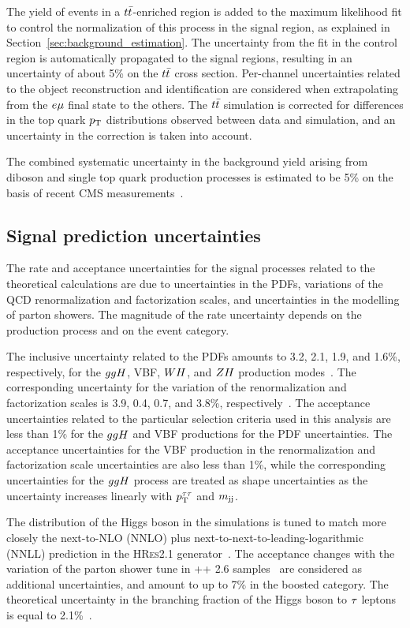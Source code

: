 The yield of events in a $t\bar{t}$-enriched region is added to the maximum likelihood fit to control the normalization of this process
in the signal region, as explained in Section~\ref{sec:background_estimation}. The uncertainty from the fit in the control region is automatically propagated to the signal regions, resulting in an uncertainty of about 5\% on the $t\bar{t}$ cross section. Per-channel uncertainties related to the object reconstruction and identification are considered when extrapolating from the $e\mu$ final state to the others. The $t\bar{t}$ simulation is corrected for differences in the top quark $p_\mathrm{T}$ distributions observed between data and simulation, and an uncertainty in the correction is taken into account.

The combined systematic uncertainty in the background yield arising from diboson and single top quark production processes is estimated to be 5\%
on the basis of recent CMS measurements~\cite{Khachatryan:2016tgp,Sirunyan:2016cdg}.


\subsection{Signal prediction uncertainties}

The rate and acceptance uncertainties for the signal processes related to the theoretical calculations are due to uncertainties in the PDFs, variations of the QCD renormalization and factorization scales,
and uncertainties in the modelling of parton showers.
The magnitude of the rate uncertainty depends on the production process and on the event category.

The inclusive uncertainty related to the PDFs amounts to 3.2, 2.1, 1.9, and 1.6\%, respectively, for the $ ggH $, VBF, $WH$, and $ZH$ production modes~\cite{deFlorian:2016spz}. The
corresponding uncertainty for the variation of the renormalization and factorization scales is 3.9, 0.4, 0.7, and 3.8\%, respectively~\cite{deFlorian:2016spz}.
The acceptance uncertainties related to the particular selection criteria used in this analysis are less than 1\% for the $ ggH $ and VBF productions for the PDF
uncertainties. The acceptance uncertainties for the VBF production in the renormalization and factorization scale uncertainties are also less than 1\%, while the corresponding uncertainties for the $ ggH $ process are treated as shape uncertainties as the uncertainty increases
linearly with $p_\mathrm{T}^{\tau\tau}$ and $m_\mathrm{jj}$.

The \pt distribution of the Higgs boson in the {} simulations is tuned to match more closely
the next-to-NLO (NNLO) plus
next-to-next-to-leading-logarithmic (NNLL) prediction in the
\textsc{HRes2.1} generator~\cite{deFlorian:2012mx,Grazzini:2013mca}.
The acceptance changes with the variation of the parton shower tune in \HERWIG++ 2.6 samples~\cite{Bellm:2013hwb} are considered as additional uncertainties, and amount to up to 7\% in the boosted category. The theoretical uncertainty in the branching fraction of the Higgs boson to $\tau$ leptons is equal to 2.1\%~\cite{deFlorian:2016spz}.

